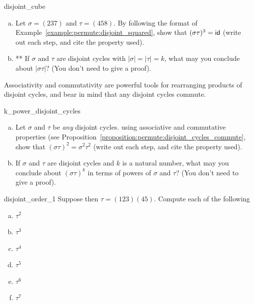 \begin{exercise}{disjoint_cube}
\begin{enumerate}[(a)]
\item
Let $\sigma = (237)$ and $\tau = (458)$. By following the format of Example~\ref{example:permute:disjoint_squared}, show that $(\sigma \tau)^3 = {\sf{i}d} $ (write out each step, and cite the property used).
\item
** If $\sigma$ and $\tau$ are disjoint cycles with $|\sigma| = |\tau| = k$, what may you conclude about $| \sigma \tau |$? (You don't need to give a proof).
\end{enumerate}
\end{exercise}

\noindent
Associativity and commutativity are powerful tools for rearranging products of disjoint cycles, and bear in mind that any disjoint cycles commute.

\begin{exercise}{k_power_disjoint_cycles}
\begin{enumerate}[(a)]
\item
Let $\sigma$ and $\tau$ be \emph{any} disjoint cycles. using associative and commutative properties (see Proposition~\ref{proposition:permute:disjoint_cycles_commute}, show that $(\sigma \tau)^2 = \sigma^2 \tau^2$ (write out each step, and cite the property used).
\item
If $\sigma$ and $\tau$ are disjoint cycles and $k$ is a natural number, what may you conclude about $(\sigma \tau)^k$ in terms of powers of $\sigma$ and $\tau$? (You don't need to give a proof).
\end{enumerate}
\end{exercise}




\begin{exercise}{disjoint_order_1}
Suppose then $\tau = (1 2 3)( 4 5)$. Compute each of the following
\begin{multicols}{3}
\begin{enumerate}[(a)]
\item 
$\tau^2$
\item 
$\tau^3$
\item 
$\tau^4$
\item 
$\tau^5$
\item 
$\tau^6$
\item
$\tau^7$
\end{enumerate}
\end{multicols}
\end{exercise}

